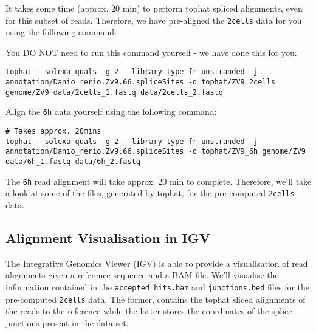 It takes some time (approx. 20 min) to perform tophat spliced alignments, even for this subset of
reads. Therefore, we have pre-aligned the \texttt{2cells} data for you using the following command:
\begin{warning}
You DO NOT need to run this command yourself - we have done this for you.

\begin{lstlisting}
tophat --solexa-quals -g 2 --library-type fr-unstranded -j annotation/Danio_rerio.Zv9.66.spliceSites -o tophat/ZV9_2cells genome/ZV9 data/2cells_1.fastq data/2cells_2.fastq
\end{lstlisting}
\end{warning}

\begin{steps}
Align the \texttt{6h} data yourself using the following command:  

\begin{lstlisting}
# Takes approx. 20mins
tophat --solexa-quals -g 2 --library-type fr-unstranded -j annotation/Danio_rerio.Zv9.66.spliceSites -o tophat/ZV9_6h genome/ZV9 data/6h_1.fastq data/6h_2.fastq
\end{lstlisting}

\end{steps}

The \texttt{6h} read alignment will take approx. 20 min to complete. Therefore,
we'll take a look at some of the files, generated by tophat, for the
pre-computed \texttt{2cells} data.

\subsection{Alignment Visualisation in IGV}

The Integrative Genomics Viewer (IGV) is able to provide a visualisation of read
alignments given a reference sequence and a BAM file. We'll visualise the
information contained in the \texttt{accepted\_hits.bam} and
\texttt{junctions.bed} files for the pre-computed \texttt{2cells} data. The
former, contains the tophat sliced alignments of the reads to the reference
while the latter stores the coordinates of the splice junctions present in the
data set.

